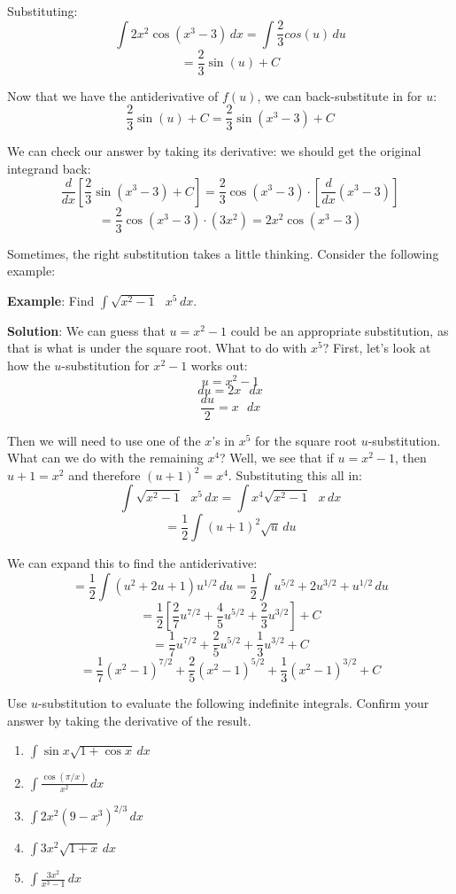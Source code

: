 Substituting:
$$\int 2 x^2 \cos{ \left( x^3 - 3 \right)} \,dx = \int \frac{2}{3} cos{ \left( 
u \right)}\,du$$
$$= \frac{2}{3} \sin{ \left( u \right)} + C$$

Now that we have the antiderivative of $f(u)$, we can back-substitute in for 
$u$:
$$ \frac{2}{3} \sin{ \left( u \right)} + C = \frac{2}{3} \sin{ \left( x^3 - 3 
\right)} + C$$

We can check our answer by taking its derivative: we should get the original 
integrand back:
$$\frac{d}{dx} \left[ \frac{2}{3} \sin{ \left( x^3 - 3 \right)} + C \right] = 
\frac{2}{3} \cos{ \left( x^3 - 3 \right)}  \cdot \left[ \frac{d}{dx} \left( x^3 
- 3 \right) \right]$$
$$= \frac{2}{3} \cos{ \left( x^3 - 3 \right)} \cdot \left( 3 x^2 \right) = 2 
x^2 \cos{ \left( x^3 - 3 \right)}$$

Sometimes, the right substitution takes a little thinking. Consider the 
following example:

\textbf{Example}: Find $\int \sqrt{x^2 - 1} \text{ }x^5\,dx$.

\textbf{Solution}: We can guess that $u = x^2 - 1$ could be an appropriate 
substitution, as that is what is under the square root. What to do with $x^5$? 
First, let's look at how the $u$-substitution for $x^2 - 1$ works out:
$$u = x^2 - 1$$
$$du = 2x\text{ }dx$$
$$\frac{du}{2} = x\text{ }dx$$

Then we will need to use one of the $x$'s in $x^5$ for the square root 
$u$-substitution. What can we do with the remaining $x^4$? Well, we see that 
if $u = x^2 - 1$, then $u + 1 = x^2$ and therefore $\left( u + 1 \right)^2 = 
x^4$. Substituting this all in:
$$\int \sqrt{x^2 - 1} \text{ }x^5\,dx = \int x^4 \sqrt{x^2 - 1}\text{ }x\,dx$$
$$= \frac{1}{2} \int \left( u + 1 \right)^2 \sqrt{u}\,du$$

We can expand this to find the antiderivative:
$$= \frac{1}{2} \int \left( u^2 + 2u + 1 \right) u^{1/2}\,du = \frac{1}{2} 
\int u^{5/2} + 2u^{3/2} + u^{1/2}\,du$$
$$= \frac{1}{2} \left[ \frac{2}{7}u^{7/2} + \frac{4}{5}u^{5/2} + \frac{2}{3}
u^{3/2} \right] + C$$
$$= \frac{1}{7}u^{7/2} + \frac{2}{5}u^{5/2} + \frac{1}{3}u^{3/2} + C$$
$$= \frac{1}{7} \left( x^2 - 1 \right)^{7/2} + \frac{2}{5} \left( x^2 - 1 
\right)^{5/2} + \frac{1}{3} \left( x^2 - 1 \right)^{3/2} + C$$

\begin{Exercise}[title = {Indefinite Integrals and u-substitution}, 
label = u_indef]
Use $u$-substitution to evaluate the following indefinite integrals. Confirm 
your answer by taking the derivative of the result. 
\begin{enumerate}
    \item $\int \sin{x} \sqrt{1 + \cos{x}}\,dx$
    \item $\int \frac{\cos{ \left( \pi / x \right)}}{x^2}\,dx$
    \item $\int 2x^2 \left( 9 - x^3 \right)^{2/3}\,dx$
    \item $\int 3x^2 \sqrt{1 + x}\,dx$
    \item $\int \frac{3x^2}{x^3 - 1}\,dx$
\end{enumerate}
\vspace{75mm}
\end{Exercise}

